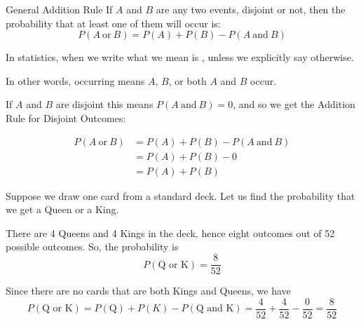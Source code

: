 \documentclass{beamer}
\newcommand{\prob}[1]{P\left(#1\right)}
\begin{document}
\begin{frame}
\begin{block}{General Addition Rule}
If $A$ and $B$ are any two events, disjoint or not, then the probability that at least one of them will occur is:
\begin{equation*}
\prob{A~\text{or}~B} = \prob{A}+\prob{B}-\prob{A~\text{and}~B}
\end{equation*}
\end{block}\pause

\begin{note}
In statistics, when we write  what we mean is , unless we explicitly say otherwise.

\vspace{1mm}
In other words,  occurring means $A$, $B$, or both $A$ and $B$ occur.
\end{note}\pause

\begin{note}
If $A$ and $B$ are disjoint this means $\prob{A~\text{and}~B}=0$, and so we get the Addition Rule for Disjoint Outcomes:

\vspace{-2mm}
\begin{equation*}
\begin{aligned}
\prob{A~\text{or}~B} &= \prob{A}+\prob{B}-\prob{A~\text{and}~B} \\
&= \prob{A}+\prob{B} - 0 \\
&= \prob{A}+\prob{B}
\end{aligned}
\end{equation*}
\end{note}
\end{frame}

\begin{frame}
\begin{example}
Suppose we draw one card from a standard deck. Let us find the probability that we get a Queen or a King.\pause

\vspace{2mm}
There are 4 Queens and 4 Kings in the deck, hence eight outcomes out of 52 possible outcomes. So, the probability is
\begin{equation*}
\prob{\text{Q or K}} = \dfrac{8}{52}
\end{equation*}\pause

Since there are no cards that are both Kings and Queens, we have
\begin{equation*}
\prob{\text{Q or K}} = \prob{\text{Q}} + \prob{K} - \prob{\text{Q and K}} = \dfrac{4}{52}+\dfrac{4}{52}-\dfrac{0}{52} = \dfrac{8}{52}
\end{equation*}
\end{example}
\end{frame}
\end{document}
